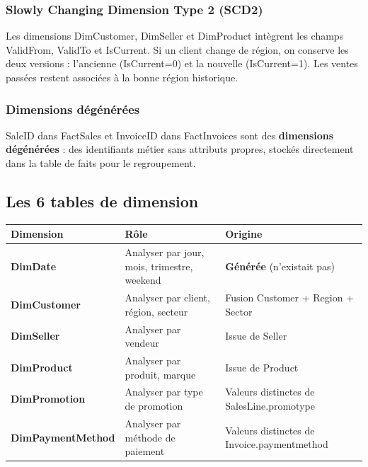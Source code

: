\documentclass[11pt,a4paper]{article}
\renewcommand{\texttt}[1]{{\ttfamily\small\colorbox{codebg}{\textcolor{darktext}{#1}}}}
\newcommand{\tableheadcolor}{\rowcolor{primary}}
\newcommand{\tableheadfont}{\color{white}\bfseries}
\begin{document}
\subsubsection{Slowly Changing Dimension Type 2 (SCD2)}

Les dimensions DimCustomer, DimSeller et DimProduct intègrent les champs \texttt{ValidFrom}, \texttt{ValidTo} et \texttt{IsCurrent}. Si un client change de région, on conserve les deux versions : l'ancienne (\texttt{IsCurrent=0}) et la nouvelle (\texttt{IsCurrent=1}). Les ventes passées restent associées à la bonne région historique.

\subsubsection{Dimensions dégénérées}

\texttt{SaleID} dans FactSales et \texttt{InvoiceID} dans FactInvoices sont des \textbf{dimensions dégénérées} : des identifiants métier sans attributs propres, stockés directement dans la table de faits pour le regroupement.

\subsection{Les 6 tables de dimension}

\begin{center}
\small
\begin{tabularx}{\textwidth}{>{\bfseries}l X X}
\toprule
\tableheadcolor
\tableheadfont Dimension & \tableheadfont Rôle & \tableheadfont Origine \\
\midrule
DimDate & Analyser par jour, mois, trimestre, weekend & \textbf{Générée} (n'existait pas) \\
\rowcolor{lightbg}
DimCustomer & Analyser par client, région, secteur & Fusion Customer + Region + Sector \\
DimSeller & Analyser par vendeur & Issue de Seller \\
\rowcolor{lightbg}
DimProduct & Analyser par produit, marque & Issue de Product \\
DimPromotion & Analyser par type de promotion & Valeurs distinctes de SalesLine.promotype \\
\rowcolor{lightbg}
DimPaymentMethod & Analyser par méthode de paiement & Valeurs distinctes de Invoice.paymentmethod \\
\bottomrule
\end{tabularx}
\end{center}
\end{document}
